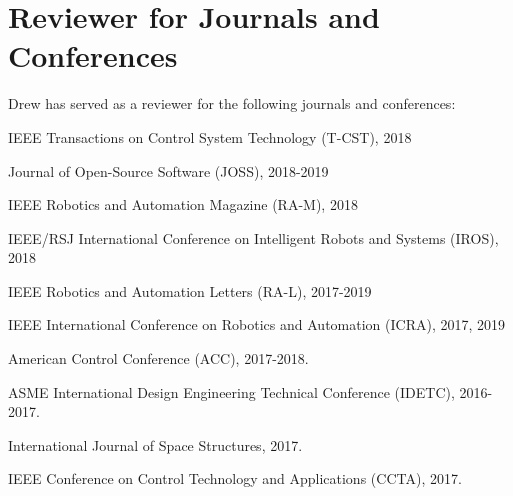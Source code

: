 \documentclass[letterpaper]{deedy-resume} %
\begin{document}
{%


\section{Reviewer for Journals and Conferences}

\vspace{0.2cm}

Drew has served as a reviewer for the following journals and conferences:

\vspace{0.2cm}

\begin{tightitemize}

\item IEEE Transactions on Control System Technology (T-CST), 2018

\item Journal of Open-Source Software (JOSS), 2018-2019
  
\item IEEE Robotics and Automation Magazine (RA-M), 2018

\item IEEE/RSJ International Conference on Intelligent Robots and Systems (IROS), 2018

\item IEEE Robotics and Automation Letters (RA-L), 2017-2019
  
\item IEEE International Conference on Robotics and Automation (ICRA), 2017, 2019

\item American Control Conference (ACC), 2017-2018.

\item ASME International Design Engineering Technical Conference (IDETC), 2016-2017.

\item International Journal of Space Structures, 2017.

\item IEEE Conference on Control Technology and Applications (CCTA), 2017.

\end{tightitemize}


}
\end{document}
